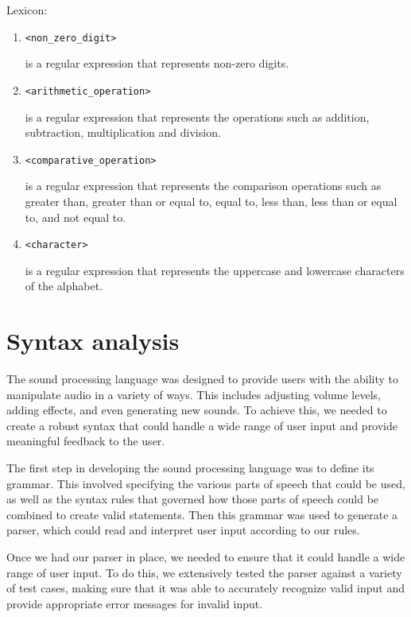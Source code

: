 Lexicon: 

\begin{enumerate}
\item \begin{verbatim}<non_zero_digit>\end{verbatim} is a regular expression that represents non-zero digits.
\item \begin{verbatim}<arithmetic_operation>\end{verbatim} is a regular expression that represents the operations such as addition, subtraction, multiplication and division.
\item \begin{verbatim}<comparative_operation> \end{verbatim}is a regular expression that represents the comparison operations such as greater than, greater than or equal to, equal to, less than, less than or equal to, and not equal to.
\item \begin{verbatim}<character> \end{verbatim}is a regular expression that represents the uppercase and lowercase characters of the alphabet.
\end{enumerate}

\section{Syntax analysis}

The sound processing language was designed to provide users with the ability to manipulate audio in a variety of ways. This includes adjusting volume levels, adding effects, and even generating new sounds. To achieve this, we needed to create a robust syntax that could handle a wide range of user input and provide meaningful feedback to the user.

The first step in developing the sound processing language was to define its grammar. This involved specifying the various parts of speech that could be used, as well as the syntax rules that governed how those parts of speech could be combined to create valid statements.  Then this grammar was used to generate a parser, which could read and interpret user input according to our rules.

Once we had our parser in place, we needed to ensure that it could handle a wide range of user input. To do this, we extensively tested the parser against a variety of test cases, making sure that it was able to accurately recognize valid input and provide appropriate error messages for invalid input.

